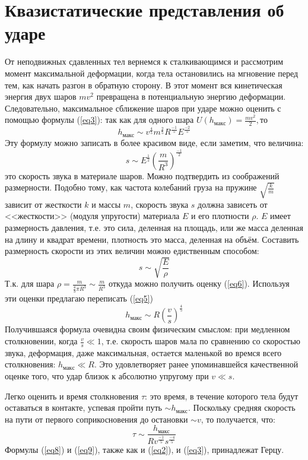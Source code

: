 \documentclass[a4paper]{article}
\begin{document}
\section{Квазистатические представления об ударе}
От неподвижных сдавленных тел вернемся к сталкивающимся и рассмотрим момент максимальной деформации, когда тела остановились на мгновение перед тем, как начать разгон в обратную сторону. В этот момент вся кинетическая энергия двух шаров $mv^2$ превращена в потенциальную энергию деформации. Следовательно, максимальное сближение шаров при ударе можно оценить с помощью формулы (\ref{eq3}): так как для одного шара $U(h_{макс})=\frac{mv^2}{2}, то$
\begin{equation}
h_{макс} \sim v^{\frac{4}{5}}m^{\frac{2}{5}}R^{\frac{-1}{5}}E^{\frac{-2}{5}}
\label{eq5}
\end{equation}
Эту формулу можно записать в более красивом виде, если заметим, что величина:
\begin{equation}
s \sim E^{\frac{1}{2}}\left(\frac{m}{R^3}\right)^{\frac{-1}{2}}
\label{eq6}
\end{equation} 
это скорость звука в материале шаров. Можно подтвердить из соображений размерности. Подобно тому, как частота колебаний груза на пружине $\sqrt{\frac{k}{m}}$ зависит от жесткости $k$ и массы $m$, скорость звука $s$ должна зависеть от <<жесткости>> (модуля упругости) материала $E$ и его плотности $\rho$. $E$ имеет размерность давления, т.е. это сила, деленная на площадь, или же масса деленная на длину и квадрат времени, плотность это масса, деленная на объём. Составить размерность скорости из этих величин можно едиственным способом:
\begin{equation}
s \sim \sqrt{\frac{E}{\rho}}
\label{eq7}
\end{equation}
Т.к. для шара $\rho = \frac{m}{\frac{4}{3} \pi R^3} \sim \frac{m}{R^3}$
откуда можно получить оценку (\ref{eq6}). Используя эти оценки предлагаю переписать (\ref{eq5})
\begin{equation}
h_{макс} \sim R\left(\frac{v}{s}\right)^{\frac{4}{5}}
\label{eq8}
\end{equation}
Получившаяся формула очевидна своим физическим смыслом: при медленном столкновении, когда $\frac{v}{s} \ll 1$, т.е. скорость шаров мала по сравнению со скоростью звука, деформация, даже максимальная, остается маленькой во времся всего столкновения:
$h_{макс} \ll R.$ Это удовлетворяет ранее упоминавшейся качественной оценке того, что удар близок к абсолютно упругому при $v \ll s.$


Легко оценить и время столкновения $\tau$: это время, в течение которого тела будут оставаться в контакте, успевая пройти путь $\sim h_{макс}$.
Поскольку средняя скорость на пути от первого соприкосновения до остановки $\sim v$, то получается, что:
\begin{equation}
\tau \sim \frac{h_{макс}}{Rv^{\frac{-1}{5}}s^{\frac{-4}{5}}}
\label{eq9}
\end{equation}
\newline
Формулы (\ref{eq8}) и (\ref{eq9}), также как и (\ref{eq2}), и (\ref{eq3}), принадлежат Герцу.
\newline
\end{document}
